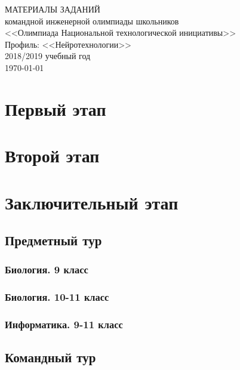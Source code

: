 \documentclass[a4paper,12pt,oneside]{book}
\begin{document}
\begin{titlepage}
    \begin{center}
        \huge{МАТЕРИАЛЫ ЗАДАНИЙ} \\
        \Large{командной инженерной олимпиады школьников} \\
        \Large{<<Олимпиада Национальной технологической инициативы>>} \\
        \Large{Профиль: <<Нейротехнологии>>} \\
        \large{2018/2019 учебный год} \\
        \vspace{2cm}
        \Large{\today}  
    \end{center}
\end{titlepage}

\setcounter{tocdepth}{1}

\tableofcontents

\part{Первый этап}




\part{Второй этап}



\part{Заключительный этап}

\clearpage
\chapter{Предметный тур}

\section{Биология. 9 класс}


\section{Биология. 10-11 класс}


\section{Информатика. 9-11 класс}


\chapter{Командный тур}


\end{document}
